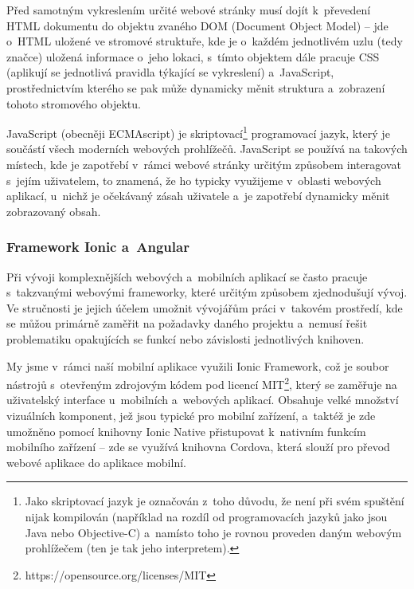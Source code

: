 Před samotným vykreslením určité webové stránky musí dojít k~převedení
HTML dokumentu do objektu zvaného DOM (Document Object Model) -- jde
o~HTML uložené ve stromové struktuře, kde je o~každém jednotlivém uzlu
(tedy značce) uložená informace o~jeho lokaci, s~tímto objektem dále
pracuje CSS (aplikují se jednotlivá pravidla týkající se vykreslení)
a~JavaScript, prostřednictvím kterého se pak může dynamicky měnit
struktura a~zobrazení tohoto stromového objektu.
\parencite{howbrowserswork}

JavaScript (obecněji ECMAscript) je
skriptovací\footnote{Jako skriptovací jazyk je označován z~toho důvodu, že není při svém spuštění nijak kompilován (například na rozdíl od programovacích jazyků jako jsou Java nebo Objective-C) a~namísto toho je rovnou proveden daným webovým prohlížečem (ten je tak jeho interpretem).}
programovací jazyk, který je součástí všech moderních webových
prohlížečů. JavaScript se používá na takových místech, kde je zapotřebí
v~rámci webové stránky určitým způsobem interagovat s~jejím uživatelem,
to znamená, že ho typicky využijeme v~oblasti webových aplikací, u~nichž
je očekávaný zásah uživatele a~je zapotřebí dynamicky měnit zobrazovaný
obsah.~\parencite{javascript}

\hypertarget{framework-ionic-a-angular}{%
\subsubsection{Framework Ionic a~Angular}\label{framework-ionic-a-angular}}

Při vývoji komplexnějších webových a~mobilních aplikací se často pracuje
s~takzvanými webovými frameworky, které určitým způsobem zjednodušují
vývoj. Ve stručnosti je jejich účelem umožnit vývojářům práci v~takovém
prostředí, kde se můžou primárně zaměřit na požadavky daného projektu
a~nemusí řešit problematiku opakujících se funkcí nebo závislosti
jednotlivých knihoven.

My jsme v~rámci naší mobilní aplikace využili Ionic Framework, což je
soubor nástrojů s~otevřeným zdrojovým kódem pod licencí
MIT\footnote{https://opensource.org/licenses/MIT}, který se zaměřuje na
uživatelský interface u~mobilních a~webových aplikací. Obsahuje velké
množství vizuálních komponent, jež jsou typické pro mobilní zařízení,
a~taktéž je zde umožněno pomocí knihovny Ionic Native přistupovat
k~nativním funkcím mobilního zařízení -- zde se využívá knihovna Cordova,
která slouží pro převod webové aplikace do aplikace mobilní.
\parencite{cordova}

